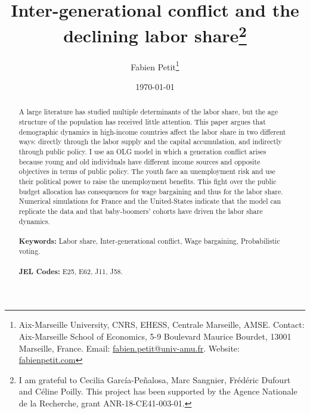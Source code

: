 \documentclass[12pt]{article}
\begin{document}
	
	\begin{titlepage}
		\title{Inter-generational conflict and the declining labor share\thanks{I am grateful to Cecilia García-Peñalosa, Marc Sangnier, Frédéric Dufourt and Céline Poilly. This project has been supported by the Agence Nationale de la Recherche, grant ANR-18-CE41-003-01.}}
		\author{Fabien Petit\thanks{Aix-Marseille University, CNRS, EHESS, Centrale Marseille, AMSE. Contact: Aix-Marseille School of Economics, 5-9 Boulevard Maurice Bourdet, 13001 Marseille, France. Email: \href{mailto:fabien.petit@univ-amu.fr}{fabien.petit@univ-amu.fr}. Website: \href{www.fabienpetit.com}{fabienpetit.com}}}
		\date{\today}
		\maketitle
		\begin{abstract}
			\noindent A large literature has studied multiple determinants of the labor share, but the age structure of the population has received little attention. This paper argues that demographic dynamics in high-income countries affect the labor share in two different ways: directly through the labor supply and the capital accumulation, and indirectly through public policy. I use an OLG model in which a generation conflict arises because young and old individuals have different income sources and opposite objectives in terms of public policy. The youth face an unemployment risk and use their political power to raise the unemployment benefits. This fight over the public budget allocation has consequences for wage bargaining and thus for the labor share. Numerical simulations for France and the United-States indicate that the model can replicate the data and that baby-boomers' cohorts have driven the labor share dynamics.\\
			\vspace{0in}\\
			\noindent\textbf{Keywords:} Labor share, Inter-generational conflict, Wage bargaining, Probabilistic voting.\\
			\vspace{0in}\\
			\noindent\textbf{JEL Codes:} E25, E62, J11, J58.\\
			
			\bigskip
		\end{abstract}
		\setcounter{page}{0}
		\thispagestyle{empty}
	\end{titlepage}
	\pagebreak \newpage
	
	\doublespacing
	
\end{document}
